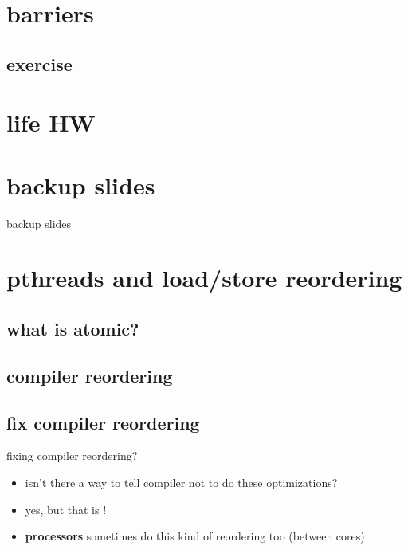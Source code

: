

\section{barriers}


\subsection{exercise}


\section{life HW}


\section{backup slides}
\begin{frame}{backup slides}
\end{frame}

\section{pthreads and load/store reordering}



\subsection{what is atomic?}


\subsection{compiler reordering}


\subsection{fix compiler reordering}
\begin{frame}{fixing compiler reordering?}
    \begin{itemize}
    \item isn't there a way to tell compiler not to do these optimizations?
    \item yes, but that is !
    \item \textbf{processors} sometimes do this kind of reordering too (between cores)
    \end{itemize}
\end{frame}




